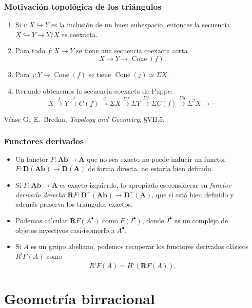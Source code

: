 \documentclass[12pt]{beamer}
\begin{document}
\begin{frame}
  \frametitle{Motivación topológica de los triángulos}
  \begin{enumerate}
    \item Si $i \colon X \hookrightarrow Y$ es la inclusión de un buen subespacio, entonces la secuencia $X \hookrightarrow Y \to Y/X$ es coexacta.
      \pause
    \item Para todo $f \colon X \to Y$ se tiene una secuencia coexacta corta
      \[ X \to Y \to \operatorname{Cone}(f). \]
      \pause
    \item Para $j \colon Y \hookrightarrow \operatorname{Cone}(f)$ se tiene $\operatorname{Cone}(j) \simeq \Sigma X$.
      \pause
    \item Iterando obtenemos la secuencia coexacta de Puppe:
      \[ X \xrightarrow{f} Y \xrightarrow{j} C(f) \xrightarrow{g} \Sigma X \xrightarrow{\Sigma f} \Sigma Y \xrightarrow{\Sigma j} \Sigma C(f) \xrightarrow{\Sigma g} \Sigma^{2} X \to \cdots \]
  \end{enumerate}
  Véase G.~E.~Bredon, \textit{Topology and Geometry}, \S VII.5.
\end{frame}

\begin{frame}
  \frametitle{Functores derivados}
  \begin{itemize}
    \item Un functor $F \colon \mathbf{Ab} \to \mathbf{A}$ que no sea exacto no puede inducir un functor $F \colon \mathbf{D}(\mathbf{Ab}) \to \mathbf{D}(\mathbf{A})$ de forma directa, no estaría bien definido.
      \pause
    \item Si $F \colon \mathbf{Ab} \to \mathbf{A}$ es exacto izquierdo, lo apropiado es considerar su \textit{functor derivado derecho} $\mathbf{R}F \colon \mathbf{D}^{+}(\mathbf{Ab}) \to \mathbf{D}^{+}(\mathbf{A})$, que sí está bien definido y además preserva los triángulos exactos.
      \pause
    \item Podemos calcular $\mathbf{R}F(A^{\bullet})$ como $F(I^{\bullet})$, donde $I^{\bullet}$ es un complejo de objetos inyectivos casi-isomorfo a $A^{\bullet}$.
      \pause
    \item Si $A$ es un grupo abeliano, podemos recuperar los functores derivados clásicos $R^{i}F(A)$ como
      \[ R^{i}F(A) = H^{i}(\mathbf{R}F(A)). \]
  \end{itemize}
\end{frame}

\section{Geometría birracional}
\end{document}
